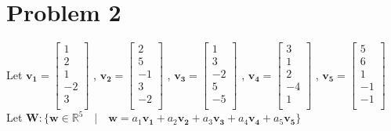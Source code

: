 \documentclass{article}
\begin{document}
\section*{Problem 2}
Let
$\mathbf{v_1}
=
\begin{bmatrix}
1  \\
2  \\
1  \\
-2 \\
3  \\
\end{bmatrix}
$
,
$\mathbf{v_2}
=
\begin{bmatrix}
2  \\
5  \\
-1 \\
3  \\
-2 \\
\end{bmatrix}
$
,
$\mathbf{v_3}
=
\begin{bmatrix}
1  \\
3  \\
-2 \\
5  \\
-5 \\
\end{bmatrix}
$
,
$\mathbf{v_4}
=
\begin{bmatrix}
3  \\
1  \\
2  \\
-4 \\
1  \\
\end{bmatrix}
$
,
$\mathbf{v_5}
=
\begin{bmatrix}
5  \\
6  \\
1  \\
-1 \\
-1 \\
\end{bmatrix}
$
\newline
Let $\mathbf{W}: \{ \mathbf{w}\in \mathbb{R}^5 \quad | \quad \mathbf{w} = a_1\mathbf{v_1} + a_2\mathbf{v_2} + a_3\mathbf{v_3} + a_4\mathbf{v_4} + a_5\mathbf{v_5} \}$
\newline
\end{document}
